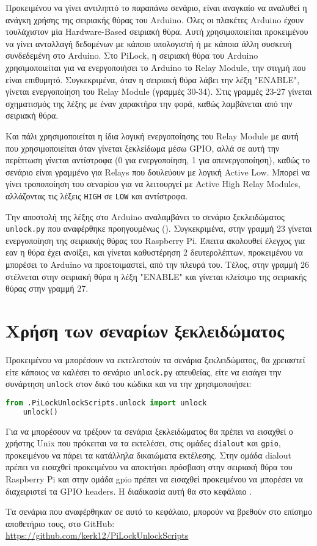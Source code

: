 	Προκειμένου να γίνει αντιληπτό το παραπάνω σενάριο, είναι αναγκαίο να αναλυθεί η ανάγκη χρήσης της σειριακής θύρας του Arduino. Όλες οι πλακέτες Arduino έχουν τουλάχιστον μία Hardware-Based σειριακή θύρα. Αυτή χρησιμοποιείται προκειμένου να γίνει ανταλλαγή δεδομένων με κάποιο υπολογιστή ή με κάποια άλλη συσκευή συνδεδεμένη στο Arduino. Στο PiLock, η σειριακή θύρα του Arduino χρησιμοποιείται για να ενεργοποιήσει το Arduino το Relay Module, την στιγμή που είναι επιθυμητό. Συγκεκριμένα, όταν η σειριακή θύρα λάβει την λέξη "ENABLE", γίνεται ενεργοποίηση του Relay Module (γραμμές 30-34). Στις γραμμές 23-27 γίνεται σχηματισμός της λέξης με έναν χαρακτήρα την φορά, καθώς λαμβάνεται από την σειριακή θύρα.

	Και πάλι χρησιμοποιείται η ίδια λογική ενεργοποίησης του Relay Module με αυτή που χρησιμοποιείται όταν γίνεται ξεκλείδωμα μέσω GPIO, αλλά σε αυτή την περίπτωση γίνεται αντίστροφα (0 για ενεργοποίηση, 1 για απενεργοποίηση), καθώς το σενάριο είναι γραμμένο για Relays που δουλεύουν με λογική Active Low. Μπορεί να γίνει τροποποίηση του σεναρίου για να λειτουργεί με Active High Relay Modules, αλλάζοντας τις λέξεις \verb|HIGH| σε \verb|LOW| και αντίστροφα.

	Την αποστολή της λέξης στο Arduino αναλαμβάνει το σενάριο ξεκλειδώματος \verb|unlock.py| που αναφέρθηκε προηγουμένως (). Συγκεκριμένα, στην γραμμή 23 γίνεται ενεργοποίηση της σειριακής θύρας του Raspberry Pi. Έπειτα ακολουθεί έλεγχος για εαν η θύρα έχει ανοίξει, και γίνεται καθυστέρηση 2 δευτερολέπτων, προκειμένου να μπορέσει το Arduino να προετοιμαστεί, από την πλευρά του. Τέλος, στην γραμμή 26 στέλνεται στην σειριακή θύρα η λέξη "ENABLE" και γίνεται κλείσιμο της σειριακής θύρας στην γραμμή 27.

\section{Χρήση των σεναρίων ξεκλειδώματος}
	Προκειμένου να μπορέσουν να εκτελεστούν τα σενάρια ξεκλειδώματος, θα χρειαστεί είτε κάποιος να καλέσει το σενάριο \verb|unlock.py| απευθείας, είτε να εισάγει την συνάρτηση \verb|unlock| στον δικό του κώδικα και να την χρησιμοποιήσει:

	\begin{lstlisting}[language=Python]
	from .PiLockUnlockScripts.unlock import unlock
	unlock()\end{lstlisting}

	Για να μπορέσουν να τρέξουν τα σενάρια ξεκλειδώματος θα πρέπει να εισαχθεί ο χρήστης Unix που πρόκειται να τα εκτελέσει, στις ομάδες \verb|dialout| και \verb|gpio|, προκειμένου να πάρει τα κατάλληλα δικαιώματα εκτέλεσης. Στην ομάδα dialout πρέπει να εισαχθεί προκειμένου να αποκτήσει πρόσβαση στην σειριακή θύρα του Raspberry Pi και στην ομάδα gpio πρέπει να εισαχθεί προκειμένου να μπορέσει να διαχειριστεί τα GPIO headers. Η διαδικασία αυτή θα στο κεφάλαιο .

	Τα σενάρια που αναφέρθηκαν σε αυτό το κεφάλαιο, μπορούν να βρεθούν στο επίσημο αποθετήριο τους, στο GitHub: \\\url{https://github.com/kerk12/PiLockUnlockScripts}